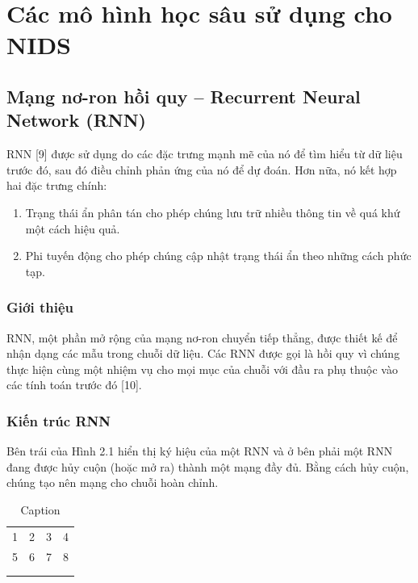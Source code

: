 \chapter{Các mô hình học sâu sử dụng cho NIDS}
\section{Mạng nơ-ron hồi quy – Recurrent Neural Network (RNN)}
RNN [9] được sử dụng do các đặc trưng mạnh mẽ của nó để tìm hiểu từ dữ liệu trước đó, sau đó điều chỉnh phản ứng của nó để dự đoán. Hơn nữa, nó kết hợp hai đặc trưng chính:
\begin{enumerate}
    \item Trạng thái ẩn phân tán cho phép chúng lưu trữ nhiều thông tin về quá khứ một cách hiệu quả. 
    \item Phi tuyến động cho phép chúng cập nhật trạng thái ẩn theo những cách phức tạp. 
\end{enumerate}

\subsection{Giới thiệu}
RNN, một phần mở rộng của mạng nơ-ron chuyển tiếp thẳng, được thiết kế để nhận dạng các mẫu trong chuỗi dữ liệu. Các RNN được gọi là hồi quy vì chúng thực hiện cùng một nhiệm vụ cho mọi mục của chuỗi với đầu ra phụ thuộc vào các tính toán trước đó [10]. 

\subsection{Kiến trúc RNN}
Bên trái của Hình 2.1 hiển thị ký hiệu của một RNN và ở bên phải một RNN đang được hủy cuộn (hoặc mở ra) thành một mạng đầy đủ. Bằng cách hủy cuộn, chúng tạo nên mạng cho chuỗi hoàn chỉnh.

\begin{table}
    \centering
    \caption{Caption}
    \begin{tabular}{cccc}
        1 & 2 & 3 & 4\\
        5 & 6 & 7 & 8\\
         &  &  & \\
         &  &  & \\
    \end{tabular}
    \label{tab:my_table}
\end{table}


